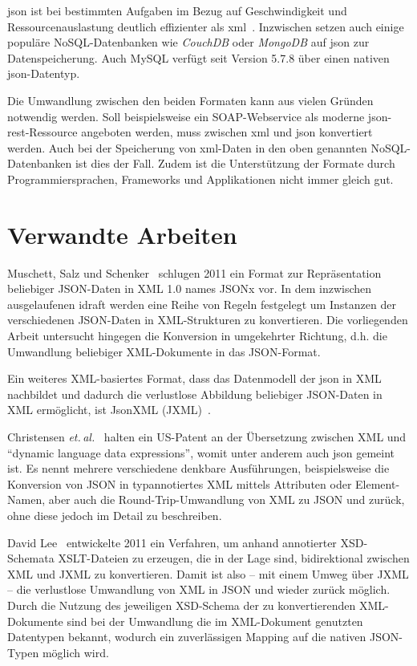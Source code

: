 \acrshort{json} ist bei bestimmten Aufgaben im Bezug auf Geschwindigkeit und
Ressourcenauslastung deutlich effizienter als \acrshort{xml}~\cite{nurseitov2009comparison}\@.
Inzwischen setzen auch einige populäre NoSQL-Datenbanken wie
\emph{CouchDB} oder \emph{MongoDB} auf \acrshort{json} zur Datenspeicherung. Auch
MySQL verfügt seit Version 5.7.8 über einen nativen \acrshort{json}-Datentyp.

Die Umwandlung zwischen den beiden Formaten kann aus vielen Gründen
notwendig werden. Soll beispielsweise ein SOAP-Webservice als moderne
\acrshort{json}-\acrshort{rest}-Ressource angeboten werden, muss zwischen \acrshort{xml} und \acrshort{json} konvertiert
werden. Auch bei der Speicherung von \acrshort{xml}-Daten in den oben genannten NoSQL-Datenbanken
ist dies der Fall. Zudem ist die Unterstützung der Formate durch
Programmiersprachen, Frameworks und Applikationen nicht immer gleich gut.

\section{Verwandte Arbeiten}

Muschett, Salz und Schenker~\cite{jsonx} schlugen 2011 ein Format zur Repräsentation beliebiger JSON-Daten in XML 1.0 names JSONx vor. In dem inzwischen ausgelaufenen \gls{idraft} werden eine Reihe von Regeln festgelegt um Instanzen der verschiedenen JSON-Daten in XML-Strukturen zu konvertieren. Die vorliegenden Arbeit untersucht hingegen die Konversion in umgekehrter Richtung, d.h. die Umwandlung beliebiger XML-Dokumente in das JSON-Format.

Ein weiteres XML-basiertes Format, dass das Datenmodell der \acrfull{json} in XML nachbildet und dadurch die verlustlose Abbildung beliebiger JSON-Daten in XML ermöglicht, ist JsonXML (JXML)~\cite{jxml}.

Christensen \emph{et.\,al.}~\cite{US7761484} halten ein US-Patent an der Übersetzung zwischen XML und \enquote{dynamic language data expressions}, womit unter anderem auch \acrshort{json} gemeint ist. Es nennt mehrere verschiedene denkbare Ausführungen, beispielsweise die Konversion von JSON in typannotiertes XML mittels Attributen oder Element-Namen, aber auch die Round-Trip-Umwandlung von XML zu JSON und zurück, ohne diese jedoch im Detail zu beschreiben.

David Lee~\cite{lee2011jxon} entwickelte 2011 ein Verfahren, um anhand annotierter XSD-Schemata XSLT-Dateien zu erzeugen, die in der Lage sind, bidirektional zwischen XML und JXML zu konvertieren.  Damit ist also -- mit einem Umweg über JXML -- die verlustlose Umwandlung von XML in JSON und wieder zurück möglich.
Durch die Nutzung des jeweiligen XSD-Schema der zu konvertierenden XML-Dokumente sind bei der Umwandlung die im XML-Dokument genutzten Datentypen bekannt, wodurch ein zuverlässigen Mapping auf die nativen JSON-Typen möglich wird.

